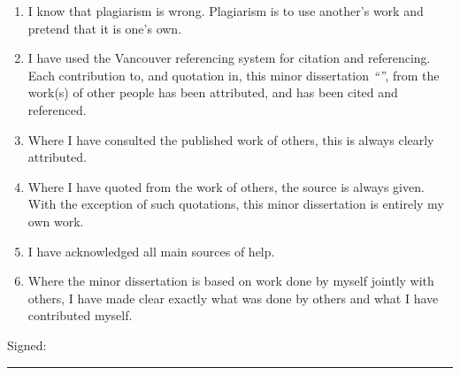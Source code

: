 \documentclass[
11pt, %
english, %
singlespacing, %
parskip, %
headsepline, %
chapterinoneline, %
oneside
]{MastersDoctoralThesis} %
\begin{document}

\begin{declaration}

\begin{enumerate} 
\item I know that plagiarism is wrong. Plagiarism is to use another's work and pretend that it is one’s own.
\item I have used the Vancouver referencing system for citation and referencing.  Each contribution to, and quotation in, this minor dissertation \textit{\enquote{\ttitle}}, from the work(s) of other people has been attributed, and has been cited and referenced.
\item Where I have consulted the published work of others, this is always clearly attributed.
\item Where I have quoted from the work of others, the source is always given. With the exception of such quotations, this minor dissertation is entirely my own work.
\item I have acknowledged all main sources of help.
\item Where the minor dissertation is based on work done by myself jointly with others, I have made clear exactly what was done by others and what I have contributed myself.
\vspace{1cm}
\end{enumerate}
 
\noindent Signed:\\
\rule[0.5em]{25em}{0.5pt} %
 
\end{declaration}

\cleardoublepage

\end{document}
